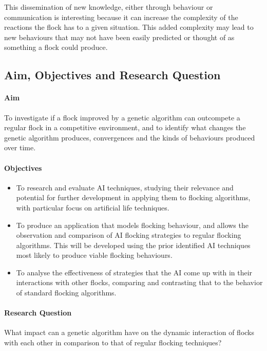 This dissemination of new knowledge, either through behaviour or communication is interesting because it can increase the complexity of the reactions the flock has to a given situation. This added complexity may lead to new behaviours that may not have been easily predicted or thought of as something a flock could produce. 



\subsection{Aim, Objectives and Research Question} 
\paragraph{Aim}To investigate if a flock improved by a genetic algorithm can outcompete a regular flock in a competitive environment, and to identify what changes the genetic algorithm produces, convergences and the kinds of behaviours produced over time.

\paragraph{Objectives} %
\begin{itemize}
\item %
To research and evaluate AI techniques, studying their relevance and potential for further development in applying them to flocking algorithms, with particular focus on artificial life techniques. 
\item
To produce an application that models flocking behaviour, and allows the observation and comparison of AI flocking strategies to regular flocking algorithms. This will be developed using the prior identified AI techniques most likely to produce viable flocking behaviours. 
\item
To analyse the effectiveness of strategies that the AI come up with in their interactions with other flocks, comparing and contrasting that to the behavior of standard flocking algorithms.
\end{itemize}

\paragraph{Research Question}
What impact can a genetic algorithm have on the dynamic interaction of flocks with each other in comparison to that of regular flocking techniques?


